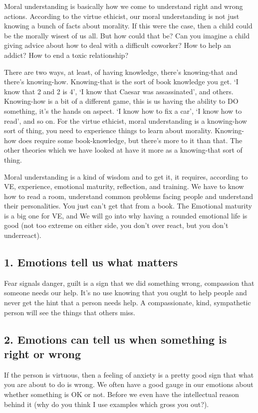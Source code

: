 Moral understanding is basically how we come to understand right and wrong actions. According to the virtue ethicist, our moral understanding is not just knowing a bunch of facts about morality. If this were the case, then a child could be the morally wisest of us all. But how could that be? Can you imagine a child giving advice about how to deal with a difficult coworker? How to help an addict? How to end a toxic relationship?

There are two ways, at least, of having knowledge, there’s knowing-that and there’s knowing-how. Knowing-that is the sort of book knowledge you get. ‘I know that 2 and 2 is 4’, ‘I know that Caesar was assassinated’, and others. Knowing-how is a bit of a different game, this is us having the ability to DO something, it’s the hands on aspect. ‘I know how to fix a car’, ‘I know how to read’, and so on. For the virtue ethicist, moral understanding is a knowing-how sort of thing, you need to experience things to learn about morality. Knowing-how does require some book-knowledge, but there’s more to it than that.  The other theories which we have looked at have it more as a knowing-that sort of thing.

Moral understanding is a kind of wisdom and to get it, it requires, according to VE, experience, emotional maturity, reflection, and training. We have to know how to read a room, understand common problems facing people and understand their personalities. You just can’t get that from a book. The Emotional maturity is a big one for VE, and We will go into why having a rounded emotional life is good (not too extreme on either side, you don’t over react, but you don’t underreact).
\subsection{1. Emotions tell us what matters}

Fear signals danger, guilt is a sign that we did something wrong, compassion that someone needs our help. It’s no use knowing that you ought to help people and never get the hint that a person needs help. A compassionate, kind, sympathetic person will see the things that others miss.
\subsection{2. Emotions can tell us when something is right or wrong}

If the person is virtuous, then a feeling of anxiety is a pretty good sign that what you are about to do is wrong. We often have a good gauge in our emotions about whether something is OK or not. Before we even have the intellectual reason behind it (why do you think I use examples which gross you out?).
